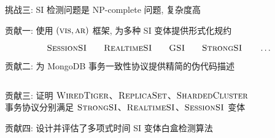 \begin{frame}{}
  \begin{center}
	挑战三: SI 检测问题是 \textsf{NP-complete} 问题, 复杂度高

	\vspace{0.60cm}
  \end{center}
\end{frame}

\begin{frame}{}
  \begin{center}
    贡献一: 使用 $(\textsc{vis}, \textsc{ar})$ 框架, 为多种 SI 变体提供形式化规约

    \vspace{0.30cm}
    \vspace{-0.50cm}

    \[
      \textsc{SessionSI} \qquad \textsc{RealtimeSI} \qquad \textsc{GSI} \qquad \textsc{StrongSI} \qquad \dots
    \]
  \end{center}
\end{frame}

\begin{frame}{}
  \begin{center}
	贡献二: 为 MongoDB 事务一致性协议提供精简的伪代码描述
  \end{center}

  \vspace{0.50cm}
  \begin{columns}
  \end{columns}
\end{frame}

\begin{frame}{}
  \begin{center}
    贡献三: 证明 $\textsc{WiredTiger}$、$\textsc{ReplicaSet}$、$\textsc{ShardedCluster}$ \\[5pt]
    事务协议分别满足 $\textsc{StrongSI}$、$\textsc{RealtimeSI}$、$\textsc{SessionSI}$ 变体
  \end{center}

\end{frame}

\begin{frame}{}
  \begin{center}
	贡献四: 设计并评估了多项式时间 SI 变体白盒检测算法
  \end{center}

\end{frame}
